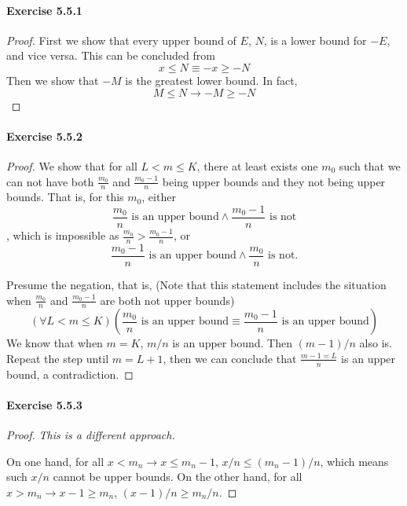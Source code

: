 \paragraph{Exercise 5.5.1} \label{exercise5.5.1}
\begin{proof}
First we show that every upper bound of $E$, $N$, is a lower bound for $-E$, and vice versa. This can be concluded from
\[
x \leq N \equiv -x \geq -N
\]
Then we show that $-M$ is the greatest lower bound. In fact,
\[
M \leq N \to -M \geq -N
\]
\end{proof}

\paragraph{Exercise 5.5.2} \label{exercise5.5.2}
\begin{proof}
We show that for all $L<m\leq K$, there at least exists one $m_0$ such that we can not have both $\frac{m_0}{n}$ and $\frac{m_0-1}{n}$ being upper bounds and they not being upper bounds. That is, for this $m_0$, either 
\[
\frac{m_0}{n} \text{ is an upper bound} \wedge \frac{m_0-1}{n} \text{ is not}
\]
, which is impossible as $\frac{m_0}{n}>\frac{m_0-1}{n}$, or
\[
\frac{m_0-1}{n} \text{ is an upper bound} \wedge \frac{m_0}{n} \text{ is not}.
\]

Presume the negation, that is, (Note that this statement includes the situation when $\frac{m_0}{n}$ and $\frac{m_0-1}{n}$ are both not upper bounds)
\[
(\forall L<m\leq K)(\frac{m_0}{n} \text{ is an upper bound} \equiv \frac{m_0-1}{n} \text{ is an upper bound})
\]
We know that when $m=K$, $m/n$ is an upper bound. Then $(m-1)/n$ also is. Repeat the step until $m=L+1$, then we can 
conclude that $\frac{m-1=L}{n}$ is an upper bound, a contradiction.
\end{proof}

\paragraph{Exercise 5.5.3} \label{exercise5.5.3}
\begin{proof}
\emph{This is a different approach.}

On one hand, for all $x<m_n \to x \leq m_n-1$, $x/n\leq (m_n-1)/n$, which means such $x/n$ cannot be upper bounds. On the other hand, 
for all $x>m_n \to x-1\geq m_n$, $(x-1)/n\geq m_n/n$.
\end{proof}


